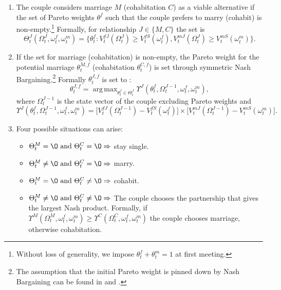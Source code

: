 \documentclass[12pt]{article}
\numberwithin{table}{section}
\DeclareMathOperator*{\argmax}{arg\,max}
\begin{document}
\begin{enumerate}
\item The couple considers marriage $M$ (cohabitation $C$) as a viable alternative if the set of Pareto weights $\theta^f$ such that the couple prefers to marry (cohabit) is non-empty.\footnote{Without loss of generality, we impose $\theta^f_t+\theta^m_t=1$ at first meeting.} Formally, for relationship $J\in\{M,C\}$ the set is
\begin{equation}\label{eq:set_couple}
\Theta^J_t(\Omega^J_t,\omega^f_t,\omega^m_t)=\big\{\theta_t^f: V_t^{fJ}(\Omega^J_t)\geq V_t^{fS}(\omega^f_t), V_t^{mJ}(\Omega^J_t)\geq V_t^{mS}(\omega^m_t)\big\}.
\end{equation}
\item If the set for marriage (cohabitation) is non-empty, the Pareto weight for the potential marriage $\theta^{M,f}_t$ (cohabitation $\theta^{C,f}_t$) is set through symmetric Nash Bargaining.\footnote{The assumption that the initial Pareto weight is pinned down by Nash Bargaining can be found in \cite{mazzocco2007} and \cite{low2018}.} Formally $\theta^{J,f}_t$ is set to :
\begin{equation}\label{nash_couple}
\theta^{J,f}_t= \argmax_{\theta^f_t\in\Theta^J_t} \Upsilon^J(\theta^f_t,\Omega^{J-1}_t,\omega^f_t,\omega^m_t),
\end{equation}
where $\Omega^{J-1}_t$ is the state vector of the couple excluding Pareto weights and
\begin{equation}
\Upsilon^J(\theta^f_t,\Omega^{J-1}_t,\omega^f_t,\omega^m_t)=\big[V_t^{fJ}(\Omega^{J-1}_t)- V_t^{fS}(\omega^f_t)\big]\times\big[ V_t^{mJ}(\Omega^{J-1}_t)- V_t^{mS}(\omega^m_t)\big].
\end{equation}
\item Four possible situations can arise:
\begin{itemize}
\item $\Theta^M_t=\O\text{ and }\Theta^C_t=\O \Rightarrow$ stay single.
\item $\Theta^M_t\neq\O\text{ and }\Theta^C_t=\O \Rightarrow$ marry.
\item $\Theta^M_t=\O\text{ and }\Theta^C_t\neq\O \Rightarrow$ cohabit.
\item $\Theta^M_t\neq\O\text{ and }\Theta^C_t\neq\O \Rightarrow$ The couple chooses the partnership that gives the largest Nash product. Formally, if $ \Upsilon^M(\Omega^M_t,\omega^f_t,\omega^m_t)\geq\Upsilon^C(\Omega^C_t,\omega^f_t,\omega^m_t)$ the couple chooses marriage, otherwise cohabitation.
\end{itemize}
\end{enumerate}
\end{document}
